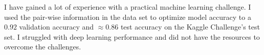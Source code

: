 I have gained a lot of experience with a practical machine learning challenge. I used the pair-wise information in the data set to optimize model accuracy to a $0.92$ validation accuracy and $\approx 0.86$ test accuracy on the Kaggle Challenge's test set. I struggled with deep learning performance and did not have the resources to overcome the challenges. 